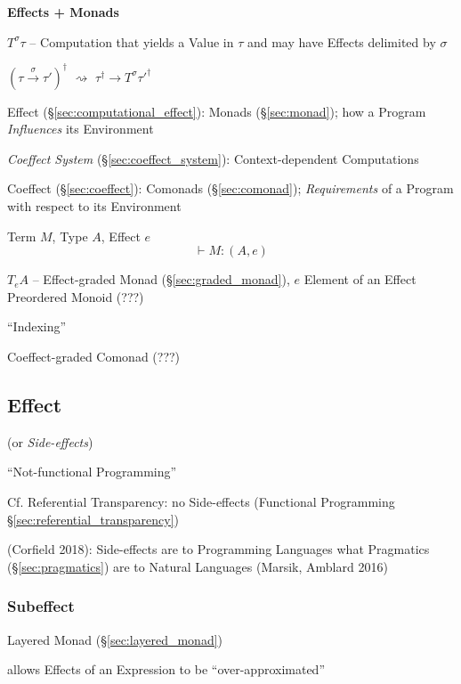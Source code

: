 \textbf{Effects + Monads}

$T^\sigma\tau$ -- Computation that yields a Value in $\tau$ and may
have Effects delimited by $\sigma$

$(\tau \xrightarrow{\sigma} \tau')^\dag$
$\rightsquigarrow$
$\tau^\dag \rightarrow T^\sigma \tau'^\dag$


\asterism


Effect (\S\ref{sec:computational_effect}): Monads (\S\ref{sec:monad});
how a Program \emph{Influences} its Environment

\emph{Coeffect System} (\S\ref{sec:coeffect_system}):
Context-dependent Computations

Coeffect (\S\ref{sec:coeffect}): Comonads (\S\ref{sec:comonad});
\emph{Requirements} of a Program with respect to its Environment

Term $M$, Type $A$, Effect $e$
\[
  \vdash M :(A,e)
\]

$T_e A$ -- Effect-graded Monad (\S\ref{sec:graded_monad}), $e$ Element
of an Effect Preordered Monoid (???)

``Indexing''

Coeffect-graded Comonad (???)



\subsection{Effect}\label{sec:effect}

(or \emph{Side-effects})

``Not-functional Programming''

\fist Cf. Referential Transparency: no Side-effects (Functional
Programming \S\ref{sec:referential_transparency})

(Corfield 2018): Side-effects are to Programming Languages what Pragmatics
(\S\ref{sec:pragmatics}) are to Natural Languages (Marsik, Amblard 2016)



\subsubsection{Subeffect}\label{sec:subeffect}

Layered Monad (\S\ref{sec:layered_monad}) \cite{filinski99}

allows Effects of an Expression to be ``over-approximated''
\cite{orchard-yoshida16}

